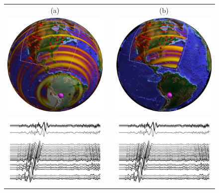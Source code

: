 \documentclass[12pt]{article}
\begin{document}
\begin{figure}[p]
	\begin{tabular}{ccc}
		(a)&&(b)\\
		\includegraphics[width=.4\textwidth]{figures/snap_glob.pdf} && \includegraphics[width=.4\textwidth]{figures/snap_reg.pdf} \\ 
		\includegraphics[width=.4\textwidth]{figures/seismo.pdf}    && \includegraphics[width=.4\textwidth]{figures/seismo.pdf}
	\end{tabular}


\end{figure}
\end{document}
